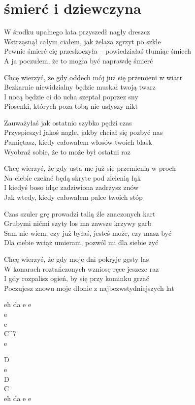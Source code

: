 \section{śmierć i dziewczyna}
\begin{text}
    \small{
    \hfill\break
W środku upalnego lata przyszedł nagły dreszcz\\
Wstrząsnął całym ciałem, jak żelaza zgrzyt po szkle\\
Pewnie śmierć cię przeskoczyła – powiedziałaś tłumiąc śmiech\\
A ja poczułem, że to mogła być naprawdę śmierć

Chcę wierzyć, że gdy oddech mój już się przemieni w wiatr\\
Bezkarnie niewidzialny będzie muskał twoją twarz\\
I nocą będzie ci do ucha szeptał poprzez sny\\
Piosenki, których poza tobą nie usłyszy nikt

Zauważyłaś jak ostatnio szybko pędzi czas\\
Przyspieszył jakoś nagle, jakby chciał się pozbyć nas\\
Pamiętasz, kiedy całowałem włosów twoich blask\\
Wyobraź sobie, że to może był ostatni raz

Chcę wierzyć, że gdy usta me już się przemienią w proch\\
Na ciebie czekać będą skryte pod zielenią łąk\\
I kiedyś boso idąc zadziwiona zadrżysz znów\\
Jak wtedy, kiedy całowałem palce twoich stóp

Czas szuler grę prowadzi talią źle znaczonych kart\\
Grubymi nićmi szyty los ma zawsze krzywy garb\\
Sam nie wiem, czy już byłaś, jesteś może, czy masz być\\
Dla ciebie wciąż umieram, pozwól mi dla siebie żyć

Chcę wierzyć, że gdy moje dni pokryje gęsty las\\
W konarach roztańczonych wzniosę ręce jeszcze raz\\
I gdy rozpalisz ogień, by się przy kominku grzać\\
Poczujesz znowu moje dłonie z najbezwstydniejszych lat
    }
\end{text}
\begin{chord}
    \small{
    eh da e e\\
    e\\
    e\\
    C^7\\
    \hfill\break
    e

    D\\
    e\\
    D\\
    C\\
    eh da e e
    }
\end{chord}